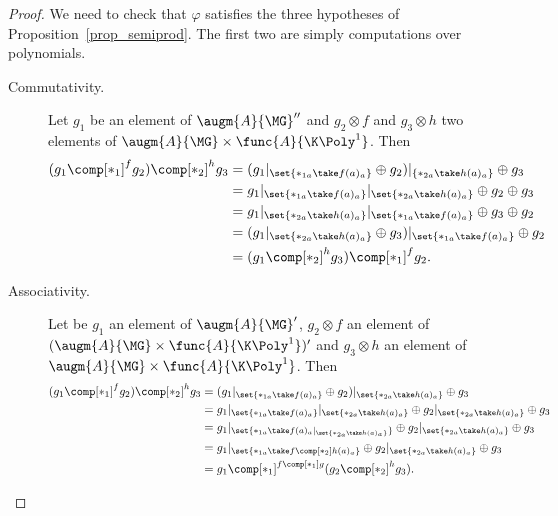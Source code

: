 \begin{proof}
    We need to check that $\varphi$ satisfies the three hypotheses of Proposition~\ref{prop_semiprod}. The 
    first two are simply computations over polynomials.
    \begin{description}
        \item[Commutativity.] Let $g_1$ be an element of $\augm{A}{\MG}''$ and $g_2\otimes f$ and 
        $g_3\otimes h$ two elements of $\augm{A}{\MG}\times\func{A}{\K\Poly^1}$. Then
        \begin{equation}\begin{split}
            (g_1\comp[\ast_1]^f g_2)\comp[\ast_2]^h g_3 
            &= (g_1|_{\set{\ast_{1a}\take f(a)_a}}\oplus g_2)|_{\{\ast_{2a}\take h(a)_a\}}\oplus g_3 \\
            &= g_1|_{\set{\ast_{1a}\take f(a)_a}}|_{\set{\ast_{2a}\take h(a)_a}}\oplus g_2\oplus g_3 \\
            &= g_1|_{\set{\ast_{2a}\take h(a)_a}}|_{\set{\ast_{1a}\take f(a)_a}}\oplus g_3\oplus g_2 \\
            &= (g_1|_{\set{\ast_{2a}\take h(a)_a}}\oplus g_3)|_{\set{\ast_{1a}\take f(a)_a}}\oplus g_2 \\
            &= (g_1\comp[\ast_2]^h g_3)\comp[\ast_1]^f g_2 .
        \end{split}\end{equation}
        \item[Associativity.] Let be $g_1$ an element of $\augm{A}{\MG}'$, $g_2\otimes f$ an element of 
        $(\augm{A}{\MG}\times\func{A}{\K\Poly^1})'$ and $g_3\otimes h$ an element of 
        $\augm{A}{\MG}\times\func{A}{\K\Poly^1}$. Then
        \begin{equation}\begin{split} 
            (g_1\comp[\ast_1]^f g_2)\comp[\ast_2]^h g_3
            &= (g_1|_{\set{\ast_{1a}\take f(a)_a}}\oplus g_2)|_{\set{\ast_{2a}\take h(a)_a}}\oplus g_3 \\
            &= g_1|_{\set{\ast_{1a}\take f(a)_a}}|_{\set{\ast_{2a}\take h(a)_a}}\oplus g_2|_{\set{\ast_{2a}\take h(a)_a}}\oplus g_3 \\
            &= g_1|_{\set{\ast_{1a}\take f(a)_a|_{\set{\ast_{2a}\take h(a)_a}}}}\oplus g_2|_{\set{\ast_{2a}\take h(a)_a}}\oplus g_3 \\
            &= g_1|_{\set{\ast_{1a}\take f\comp[\ast_2] h(a)_a}}\oplus g_2|_{\set{\ast_{2a}\take h(a)_a}}\oplus g_3 \\
            &= g_1\comp[\ast_1]^{f\comp[\ast_1] g}(g_2\comp[\ast_2]^h g_3).

\end{split}
\end{equation}
\end{description}
\end{proof}
